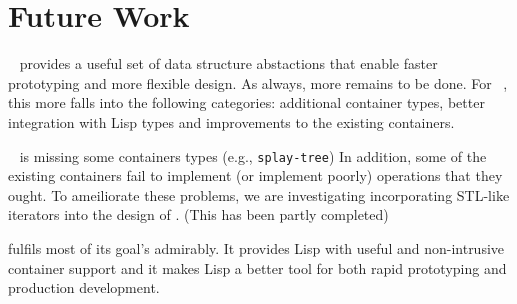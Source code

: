 \documentclass{acm_proc_article-sp}
\begin{document}
\section{Future Work}
\clcl~ provides a useful set of data structure abstactions that enable
faster prototyping and more flexible design. As always, more remains to
be done. For \clcl~, this more falls into the following categories:
additional container types, better integration with Lisp types and
improvements to the existing containers. 

\clcl~ is missing some containers types (e.g., \verb|splay-tree|)  In addition, some of the existing
containers fail to implement (or implement poorly) operations that they ought.
To ameiliorate these problems, we are investigating
incorporating STL-like iterators into the design of \clcl. (This has been partly completed)

\clcl  fulfils most of its goal's
admirably. It provides Lisp with useful and non-intrusive container
support and it makes Lisp a better tool for both rapid prototyping and
production development.
       


\end{document}
